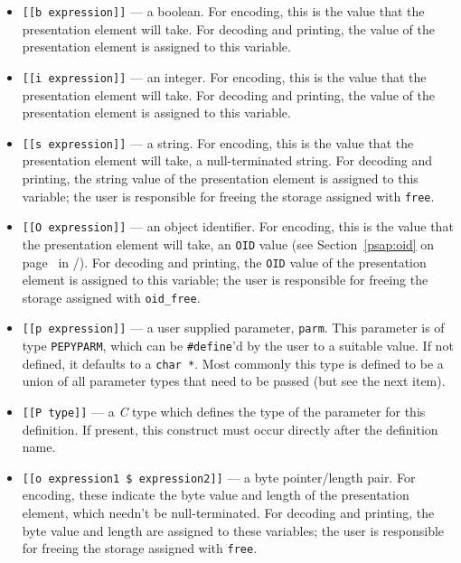 \begin{itemize}
\item	\verb"[[b expression]]" --- a boolean.
For encoding,
this is the value that the presentation element will take.
For decoding and printing,
the value of the presentation element is assigned to this variable.

\item	\verb"[[i expression]]" --- an integer.
For encoding,
this is the value that the presentation element will take.
For decoding and printing,
the value of the presentation element is assigned to this variable.

\item	\verb"[[s expression]]" --- a string.
For encoding,
this is the value that the presentation element will take,
a null-terminated string.
For decoding and printing,
the string value of the presentation element is assigned to this variable;
the user is responsible for freeing the storage assigned with \verb"free".

\item	\verb"[[O expression]]" --- an object identifier.
For encoding,
this is the value that the presentation element will take,
an \verb"OID" value
(see Section~\ref{psap:oid} on page~\pageref{psap:oid} in \volone/).
For decoding and printing,
the \verb"OID" value of the presentation element is assigned to this
variable;
the user is responsible for freeing the storage assigned with \verb"oid_free".

\item	\verb"[[p expression]]" --- a user supplied parameter, \verb"parm".
This parameter is of type \verb"PEPYPARM", which can be \verb"#define"'d by the
user to a suitable value. If not defined, it defaults to a \verb*"char *".
Most commonly this type is defined to be a union of all parameter
types that need to be passed (but see the next item).

\item	\verb"[[P type]]" --- a {\em C} type which defines the type of
the parameter for this definition. If present, this construct must
occur directly after the definition name.

\item	\verb"[[o expression1 $ expression2]]" --- a byte pointer/length pair.
For encoding,
these indicate the byte value and length of the presentation element,
which needn't be null-terminated.
For decoding and printing,
the byte value and length are assigned to these variables;
the user is responsible for freeing the storage assigned with \verb"free".


\end{itemize}
